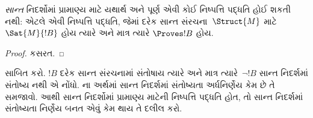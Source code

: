 \begin{cor}%
  \emph{સાન્ત} નિદર્શોમાં પ્રામાણ્ય માટે
  યથાર્થ અને પૂર્ણ એવી કોઈ નિષ્પત્તિ
  પદ્ધતિ હોઈ શકતી નથી: એટલે એવી નિષ્પત્તિ પદ્ધતિ,
  જેમાં દરેક સાન્ત સંરચના~$\Struct{M}$
  માટે $\Sat{M}{!B}$ હોય ત્યારે અને માત્ર
  ત્યારે $\Proves !B$ હોય.
\end{cor}

\begin{proof}
  કસરત.
\end{proof}

\begin{prob}
  સાબિત કરો. $!B$ દરેક સાન્ત સંરચનામાં
  સંતોષાય ત્યારે અને માત્ર ત્યારે~$\lnot !B$
  સાન્ત નિદર્શમાં સંતોષ્ય નથી એ નોંધો.
  ના અર્થમાં
  સાન્ત નિદર્શમાં સંતોષ્યતા અર્ધનિર્ણેય કેમ
  છે તે સમજાવો. આથી સાન્ત નિદર્શોમાં
  પ્રામાણ્ય માટેની નિષ્પત્તિ પદ્ધતિ હોત,
  તો સાન્ત નિદર્શમાં સંતોષ્યતા નિર્ણેય બનત
  એવું કેમ થાય તે દલીલ કરો.
\end{prob}
\endgroup


\OLEndChapterHook
\endgroup


\OLEndPartHook
